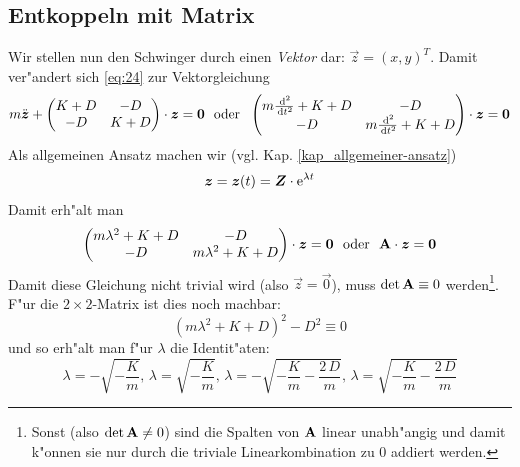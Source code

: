 \subsection{Entkoppeln mit Matrix}
\label{kap_entkoppeln-mit-matrix}

Wir stellen nun den Schwinger durch einen \emph{Vektor} dar: $\vec z =
(x,y)^T$. Damit ver"andert sich \eqref{eq:24} zur Vektorgleichung
\begin{equation}
   \label{eq:22}
   m \ddot{\boldsymbol{z}} + 
   \begin{pmatrix}
      K+D & -D\\
      -D & K+D
   \end{pmatrix} \cdot \boldsymbol{z}
= 
\boldsymbol{0} ~ \text{ oder } ~ 
   \begin{pmatrix}
      m \frac{\, \mathrm{d} ^2}{\, \mathrm{d} t^2} + K+D & -D\\
      -D & m \frac{\, \mathrm{d} ^2}{\, \mathrm{d} t^2} + K+D
   \end{pmatrix} \cdot \boldsymbol{z} = \boldsymbol{0}
\end{equation}
Als allgemeinen Ansatz machen wir
(vgl. Kap. \ref{kap_allgemeiner-ansatz})
\begin{equation}
   \label{eq:23}
   \boldsymbol{z} = \boldsymbol{z}(t) = \boldsymbol{Z} \cdot \operatorname{e}^{\lambda t}
\end{equation}
Damit erh"alt man
\begin{equation}
   \label{eq:29}
     \begin{pmatrix}
      m \lambda^2 + K+D & -D\\
      -D & m \lambda^2 + K+D
   \end{pmatrix} \cdot \boldsymbol{z} = \boldsymbol{0} 
~\text{ oder } ~ \mathbf{A} \cdot \boldsymbol{z} = \boldsymbol{0}
\end{equation}
Damit diese Gleichung nicht trivial wird (also $\vec z = \vec 0$),
muss $\det \mathbf{A} \equiv 0$ werden\footnote{Sonst (also $\det \mathbf{A}
  \neq 0$) sind die Spalten von $\mathbf{A}$ linear unabh"angig und damit
  k"onnen sie nur durch die triviale Linearkombination zu $0$ addiert
  werden.}. F"ur die $2\times 2$-Matrix ist dies noch machbar: 
\begin{equation}
   \label{eq:200}
   \left (m \lambda^2 + K+D \right)^2 - D^2 \equiv 0
\end{equation}
und so erh"alt man f"ur $\lambda$ die Identit"aten:
\begin{equation}
   \label{eq:201}
   \lambda = -\sqrt{-\frac{K}{m}} \text{, } 
\lambda = \sqrt{-\frac{K}{m}}
\text{, }
\lambda =-\sqrt{-\frac{K}{m}-\frac{2\,D}{m}}
\text{, }
\lambda=\sqrt{-\frac{K}{m}-\frac{2\,D}{m}}
\end{equation}
